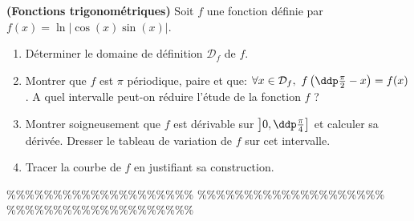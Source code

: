 



\begin{exercice}  \;
\textbf{(Fonctions trigonom\'etriques)}
\noindent Soit $f$ une fonction d\'efinie par $f(x)=\ln{\left|  \cos{(x)}\sin{(x)} \right|}$.
\begin{enumerate}
\item D\'eterminer le domaine de d\'efinition $\mathcal{D}_f$ de $f$.
\item Montrer que $f$ est $\pi$ p\'eriodique, paire et que: $\forall x\in\mathcal{D}_f,\ f\left( \ddp\frac{\pi}{2}-x\right)=f(x)$. A quel intervalle peut-on r\'eduire l'\'etude de la fonction $f$ ?
\item Montrer soigneusement que $f$ est d\'erivable sur $\left \rbrack 0,\ddp\frac{\pi}{4}\right\rbrack$ et calculer sa d\'eriv\'ee. Dresser le tableau de variation de $f$ sur cet intervalle.
\item Tracer la courbe de $f$ en justifiant sa construction.
\end{enumerate}
\end{exercice}


\%\%\%\%\%\%\%\%\%\%\%\%\%\%\%\%\%\%\%\%
\%\%\%\%\%\%\%\%\%\%\%\%\%\%\%\%\%\%\%\%
\%\%\%\%\%\%\%\%\%\%\%\%\%\%\%\%\%\%\%\%



